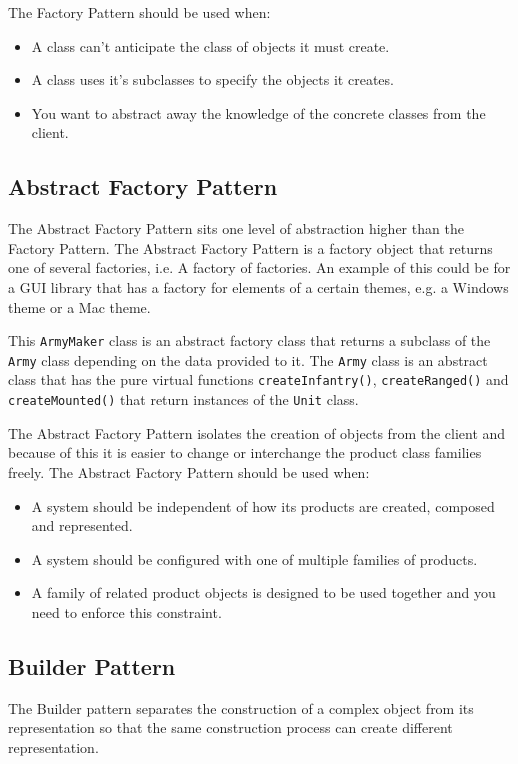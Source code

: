 \documentclass[12pt letter]{report}
\begin{document}
The Factory Pattern should be used when:
\begin{itemize}
  \item A class can't anticipate the class of objects it must create.
  \item A class uses it's subclasses to specify the objects it creates.
  \item You want to abstract away the knowledge of the concrete classes from the client.
\end{itemize}

\subsection{Abstract Factory Pattern}
The Abstract Factory Pattern sits one level of abstraction higher than the Factory Pattern. The Abstract Factory Pattern is a factory object that returns
one of several factories, i.e. A factory of factories. An example of this could be for a GUI library that has a factory for elements of a
certain themes, e.g. a Windows theme or a Mac theme.


This \lstinline{ArmyMaker} class is an abstract factory class that returns a subclass of the \lstinline{Army} class depending on the data provided to it. The \lstinline{Army} class is an abstract class that has the pure virtual functions
\lstinline{createInfantry()}, \lstinline{createRanged()} and \lstinline{createMounted()} that return instances of the \lstinline{Unit} class.

The Abstract Factory Pattern isolates the creation of objects from the client and because of this it is easier to change or interchange
the product class families freely. The Abstract Factory Pattern should be used when:
\begin{itemize}
  \item A system should be independent of how its products are created, composed and represented.
  \item A system should be configured with one of multiple families of products.
  \item A family of related product objects is designed to be used together and you need to enforce this constraint.
\end{itemize}

\subsection{Builder Pattern}
The Builder pattern separates the construction of a complex object from its representation so that the same construction process can create different representation.
\end{document}
